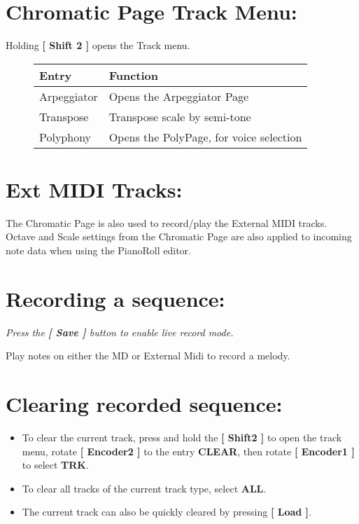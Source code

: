 \section{Chromatic Page Track Menu:}
Holding \textbf{[ Shift 2 ]} opens the Track menu.
\begin{figure}[hb]
    \begin{tabular}{|l|l|}
    \hline
    \rowcolor[HTML]{C0C0C0} 
    Entry            & Function \\ \hline
    Arpeggiator      & Opens the Arpeggiator Page \\ \hline
    Transpose        & Transpose scale by semi-tone\\ \hline
    Polyphony        & Opens the PolyPage, for voice selection\\ \hline
    \end{tabular}
\end{figure}
\section{Ext MIDI Tracks:}
The Chromatic Page is also used to record/play the External MIDI tracks.
Octave and Scale settings from the Chromatic Page are also applied to incoming note data when using the PianoRoll editor.
\newpage
\section{Recording a sequence:}
\textit{Press the \textbf{[ Save ] }button to enable live record mode.\\}

Play notes on either the MD or External Midi to record a melody.

\section{Clearing recorded sequence:}
\begin{itemize}
\item To clear the current track, press and hold the\textbf{ [ Shift2 ]} to open the track menu, rotate \textbf{[ Encoder2 ]} to the entry \textbf{CLEAR}, then rotate \textbf{[ Encoder1 ]} to select \textbf{TRK}.
\item To clear all tracks of the current track type, select \textbf{ALL}.
\item The current track can also be quickly cleared by pressing \textbf{[ Load ]}.
\end{itemize}

